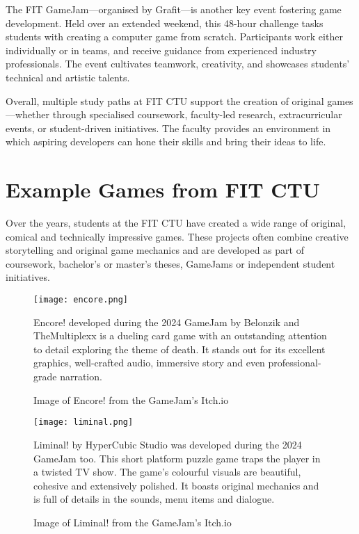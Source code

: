 The FIT GameJam—organised by Grafit—is another key event fostering game development. Held over an extended weekend, this 48-hour challenge tasks students with creating a computer game from scratch. Participants work either individually or in teams, and receive guidance from experienced industry professionals. The event cultivates teamwork, creativity, and showcases students’ technical and artistic talents.
\cite{grafit_itch}

Overall, multiple study paths at FIT CTU support the creation of original games---whether through specialised coursework, faculty-led research, extracurricular events, or student-driven initiatives. The faculty provides an environment in which aspiring developers can hone their skills and bring their ideas to life.

\section{Example Games from FIT CTU}\label{sec:example-games}
Over the years, students at the FIT CTU have created a wide range of original, comical and technically impressive games. These projects often combine creative storytelling and original game mechanics and are developed as part of coursework, bachelor’s or master’s theses, GameJams or independent student initiatives.

\begin{figure}[H]
    \texttt{[image: encore.png]}
    \caption{Image of Encore! from the GameJam's Itch.io~\cite{itch_encore}}
    \label{fig:encore-picture}
    Encore! developed during the 2024 GameJam by Belonzik and TheMultiplexx is a dueling  card game with an outstanding attention to detail exploring the theme of death. It stands out for its excellent graphics, well-crafted audio, immersive story and even professional-grade narration. \cite{itch_encore}
\end{figure}

\begin{figure}[H]
    \texttt{[image: liminal.png]}
    \caption{Image of Liminal! from the GameJam's Itch.io~\cite{itch_liminal}}
    \label{fig:liminal-picture}
    Liminal! by HyperCubic Studio was developed during the 2024 GameJam too. This short platform puzzle game traps the player in a twisted TV show. The game’s colourful visuals are beautiful, cohesive and extensively polished. It boasts original mechanics and is full of details in the sounds, menu items and dialogue. \cite{itch_liminal}
\end{figure}

